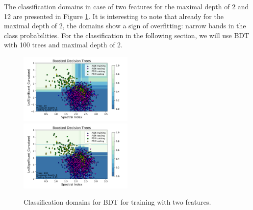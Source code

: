 The classification domains in case of two features for the maximal depth of 2 and 12 are presented in Figure \ref{fig:BDT_domains}. 
It is interesting to note that already for the maximal depth of 2, the domains show a sign of overfitting: narrow bands in the class probabilities. For the classification in the following section, we will use BDT with 100 trees and maximal depth of 2.

\begin{figure}[h]
\includegraphics[width=0.5\textwidth]{plots/classification_domains/bdt_20_2.pdf}
\includegraphics[width=0.5\textwidth]{plots/classification_domains/bdt_100_6.pdf}
\caption{Classification domains for BDT for training with two features.
}
\label{fig:BDT_domains}
\end{figure}


